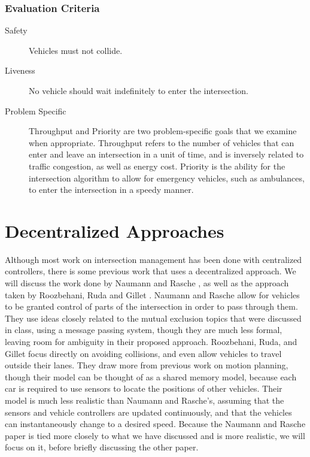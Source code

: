 \documentclass[12pt]{article}
\begin{document}
\subsubsection{Evaluation Criteria}

\begin{description}
\item[Safety] Vehicles must not collide.  
\item[Liveness] No vehicle should wait indefinitely to enter the intersection.
\item[Problem Specific]
Throughput and Priority are two problem-specific goals that we examine when appropriate. Throughput refers to the number of vehicles that can enter and leave an intersection in a unit of time, and is inversely related to traffic congestion, as well as energy cost. Priority is the ability for the intersection algorithm to allow for emergency vehicles, such as ambulances, to enter the intersection in a speedy manner.
\end{description}

\section{Decentralized Approaches}
\label{sec:decentralizedApproaches}
Although most work on intersection management has been done with centralized controllers, there is some previous work that uses a decentralized approach. We will discuss the work done by Naumann and Rasche \cite{naumann}, as well as the approach taken by Roozbehani, Ruda and Gillet \cite{roozbehani}. Naumann and Rasche allow for vehicles to be granted control of parts of the intersection in order to pass through them. They use ideas closely related to the mutual exclusion topics that were discussed in class, using a message passing system, though they are much less formal, leaving room for ambiguity in their proposed approach. Roozbehani, Ruda, and Gillet focus directly on avoiding collisions, and even allow vehicles to travel outside their lanes. They draw more from previous work on motion planning, though their model can be thought of as a shared memory model, because each car is required to use sensors to locate the positions of other vehicles. Their model is much less realistic than Naumann and Rasche's, assuming that the sensors and vehicle controllers are updated continuously, and that the vehicles can instantaneously change to a desired speed. Because the Naumann and Rasche paper is tied more closely to what we have discussed and is more realistic, we will focus on it, before briefly discussing the other paper. 
\end{document}
